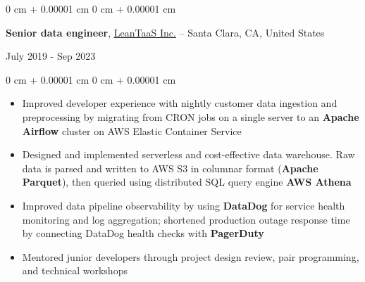 \documentclass[10pt, letterpaper]{article}
\newenvironment{highlights}{
    \begin{itemize}[
        topsep=0.10 cm,
        parsep=0.10 cm,
        partopsep=0pt,
        itemsep=0pt,
        leftmargin=0 cm + 10pt
    ]
}{
    \end{itemize}
} %
\newenvironment{onecolentry}{
    \begin{adjustwidth}{
        0 cm + 0.00001 cm
    }{
        0 cm + 0.00001 cm
    }
}{
    \end{adjustwidth}
} %
\newenvironment{twocolentry}[2][]{
    \onecolentry
    \def\secondColumn{#2}
    \setcolumnwidth{\fill, 4.5 cm}
    \begin{paracol}{2}
}{
    \switchcolumn \raggedleft \secondColumn
    \end{paracol}
    \endonecolentry
} %
\begin{document}
        \begin{twocolentry}{
            July 2019 - Sep 2023
        }
            \textbf{Senior data engineer}, \href{https://www.leantaas.com}{LeanTaaS Inc.} -- Santa Clara, CA, United States
        \end{twocolentry}
        \vspace{0.10 cm}
        \begin{onecolentry}
            \begin{highlights}
                \item Improved developer experience with nightly customer data ingestion and preprocessing by migrating from CRON jobs on a single server to an \textbf{Apache Airflow} cluster on AWS Elastic Container Service
                \item Designed and implemented serverless and cost-effective data warehouse. Raw data is parsed and written to AWS S3 in columnar format (\textbf{Apache Parquet}), then queried using distributed SQL query engine \textbf{AWS Athena}
                \item Improved data pipeline observability by using \textbf{DataDog} for service health monitoring and log aggregation; shortened production outage response time by connecting DataDog health checks with \textbf{PagerDuty}
                \item Mentored junior developers through project design review, pair programming, and technical workshops
            \end{highlights}
        \end{onecolentry}
        \vspace{0.2 cm}

    

            
\end{document}
